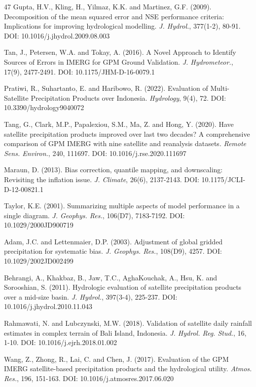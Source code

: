 \documentclass[11pt,a4paper]{article}
\begin{document}
\begin{thebibliography}{47}
 Gupta, H.V., Kling, H., Yilmaz, K.K. and Martinez, G.F. (2009).
Decomposition of the mean squared error and NSE performance criteria:
Implications for improving hydrological modelling. \emph{J. Hydrol.},
377(1-2), 80-91. DOI: 10.1016/j.jhydrol.2009.08.003

 Tan, J., Petersen, W.A. and Tokay, A. (2016). A Novel Approach
to Identify Sources of Errors in IMERG for GPM Ground Validation.
\emph{J. Hydrometeor.}, 17(9), 2477-2491. DOI: 10.1175/JHM-D-16-0079.1

 Pratiwi, R., Suhartanto, E. and Haribowo, R. (2022). Evaluation
of Multi-Satellite Precipitation Products over Indonesia.
\emph{Hydrology}, 9(4), 72. DOI: 10.3390/hydrology9040072

 Tang, G., Clark, M.P., Papalexiou, S.M., Ma, Z. and Hong, Y.
(2020). Have satellite precipitation products improved over last two
decades? A comprehensive comparison of GPM IMERG with nine satellite and
reanalysis datasets. \emph{Remote Sens. Environ.}, 240, 111697. DOI:
10.1016/j.rse.2020.111697

 Maraun, D. (2013). Bias correction, quantile mapping, and
downscaling: Revisiting the inflation issue. \emph{J. Climate}, 26(6),
2137-2143. DOI: 10.1175/JCLI-D-12-00821.1

 Taylor, K.E. (2001). Summarizing multiple aspects of model
performance in a single diagram. \emph{J. Geophys. Res.}, 106(D7),
7183-7192. DOI: 10.1029/2000JD900719

 Adam, J.C. and Lettenmaier, D.P. (2003). Adjustment of global
gridded precipitation for systematic bias. \emph{J. Geophys. Res.},
108(D9), 4257. DOI: 10.1029/2002JD002499

 Behrangi, A., Khakbaz, B., Jaw, T.C., AghaKouchak, A., Hsu, K.
and Sorooshian, S. (2011). Hydrologic evaluation of satellite
precipitation products over a mid-size basin. \emph{J. Hydrol.},
397(3-4), 225-237. DOI: 10.1016/j.jhydrol.2010.11.043

 Rahmawati, N. and Lubczynski, M.W. (2018). Validation of
satellite daily rainfall estimates in complex terrain of Bali Island,
Indonesia. \emph{J. Hydrol. Reg. Stud.}, 16, 1-10. DOI:
10.1016/j.ejrh.2018.01.002

 Wang, Z., Zhong, R., Lai, C. and Chen, J. (2017). Evaluation of
the GPM IMERG satellite-based precipitation products and the
hydrological utility. \emph{Atmos. Res.}, 196, 151-163. DOI:
10.1016/j.atmosres.2017.06.020


\end{thebibliography}
\end{document}
